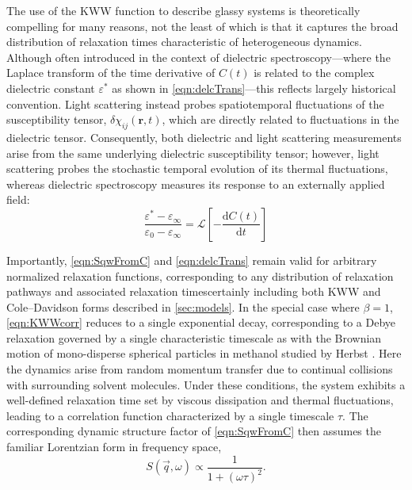 The use of the KWW function to describe glassy systems is theoretically compelling for many reasons, not the least of which is that it captures the broad distribution of relaxation times characteristic of heterogeneous dynamics. Although often introduced in the context of dielectric spectroscopy—where the Laplace transform of the time derivative of $C(t)$ is related to the complex dielectric constant $\varepsilon^*$ as shown in \eqn \ref{eqn:delcTrans}—this reflects largely historical convention. Light scattering instead probes spatiotemporal fluctuations of the susceptibility tensor, $\delta\chi_{ij}(\mathbf r,t)$, which are directly related to fluctuations in the dielectric tensor. Consequently, both dielectric and light scattering measurements arise from the same underlying dielectric susceptibility tensor; however, light scattering probes the stochastic temporal evolution of its thermal fluctuations, whereas dielectric spectroscopy measures its response to an externally applied field:
\begin{equation}
	\frac{\varepsilon^{*} - \varepsilon_{\infty}}{\varepsilon_{0} - \varepsilon_{\infty}}
	= \mathscr{L}\!\left[ -\frac{\mathrm{d}C(t)}{\mathrm{d}t} \right]
	\label{eqn:delcTrans}
\end{equation}

Importantly, \eqn \ref{eqn:SqwFromC} and \eqn \ref{eqn:delcTrans} remain valid for arbitrary normalized relaxation functions, corresponding to any distribution of relaxation pathways and associated relaxation times\textemdash certainly including both KWW and Cole--Davidson forms described in \sect \ref{sec:models}. In the special case where $\beta = 1$, \eqn\ref{eqn:KWWcorr} reduces to a single exponential decay, corresponding to a Debye relaxation governed by a single characteristic timescale as with the Brownian motion of mono-disperse spherical particles in methanol studied by Herbst \etal \cite{Herbst}. Here the dynamics arise from random momentum transfer due to continual collisions with surrounding solvent molecules. Under these conditions, the system exhibits a well-defined relaxation time set by viscous dissipation and thermal fluctuations, leading to a correlation function characterized by a single timescale $\tau$. The corresponding dynamic structure factor of \eqn \ref{eqn:SqwFromC} then assumes the familiar Lorentzian form in frequency space,
\begin{equation}
	S(\vec q,\omega) \propto \frac{1}{1 + (\omega \tau)^2}.
	\label{eqn:debye_scattering}
\end{equation}

